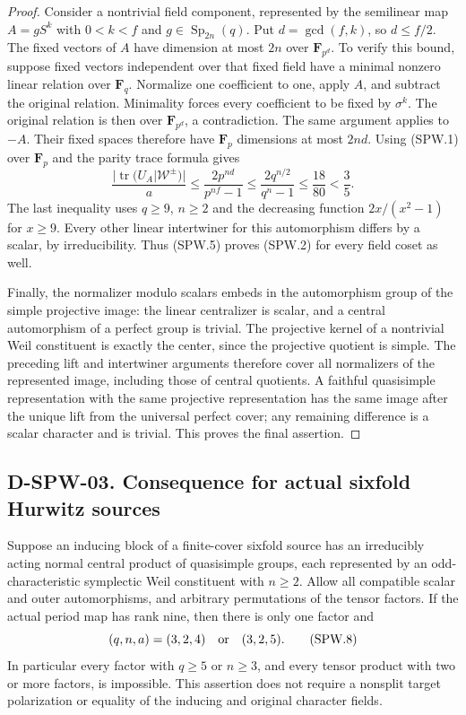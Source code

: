 \begin{proof}
Consider a nontrivial field component, represented by the
semilinear map $A=gS^k$ with $0<k<f$ and
$g\in\operatorname{Sp}_{2n}(q)$.
Put $d=\gcd(f,k)$, so $d\le f/2$.
The fixed vectors of $A$ have dimension at most $2n$ over
$\mathbf F_{p^d}$.  To verify this bound, suppose fixed vectors
independent over that fixed field have a minimal nonzero linear
relation over $\mathbf F_q$.  Normalize one coefficient to one,
apply $A$, and subtract the original relation.  Minimality forces
every coefficient to be fixed by $\sigma^k$.  The original
relation is then over $\mathbf F_{p^d}$, a contradiction.
The same argument applies to $-A$.  Their fixed spaces therefore
have $\mathbf F_p$ dimensions at most $2nd$.
Using (SPW.1) over $\mathbf F_p$ and the parity trace formula gives
\[
 \frac{|\operatorname{tr}(U_A|\mathcal W^{\pm})|}{a}
 \le\frac{2p^{nd}}{p^{nf}-1}
 \le\frac{2q^{n/2}}{q^n-1}
 \le\frac{18}{80}<\frac35.                                \tag{SPW.7}
\]
The last inequality uses $q\ge9$, $n\ge2$ and the decreasing
function $2x/(x^2-1)$ for $x\ge9$.
Every other linear intertwiner for this automorphism differs
by a scalar, by irreducibility.  Thus (SPW.5) proves (SPW.2)
for every field coset as well.

Finally, the normalizer modulo scalars embeds in the automorphism
group of the simple projective image: the linear centralizer is
scalar, and a central automorphism of a perfect group is trivial.
The projective kernel of a nontrivial Weil constituent is exactly
the center, since the projective quotient is simple.  The preceding
lift and intertwiner arguments therefore cover all normalizers
of the represented image, including those of central quotients.
A faithful quasisimple representation with the same projective
representation has the same image after the unique lift from
the universal perfect cover; any remaining difference is a scalar
character and is trivial.  This proves the final assertion.
\end{proof}

\subsection*{D-SPW-03. Consequence for actual sixfold Hurwitz sources}

\begin{theorem}
\label{D-SPW-03}
Suppose an inducing block of a finite-cover sixfold source has
an irreducibly acting normal central product of quasisimple
groups, each represented by an odd-characteristic symplectic
Weil constituent with $n\ge2$.  Allow all compatible scalar
and outer automorphisms, and arbitrary permutations of the
tensor factors.  If the actual period map has rank nine, then
there is only one factor and
\[
                 (q,n,a)=(3,2,4)\quad\hbox{or}\quad(3,2,5).
                                                               \tag{SPW.8}
\]
In particular every factor with $q\ge5$ or $n\ge3$, and every
tensor product with two or more factors, is impossible.
This assertion does not require a nonsplit target polarization
or equality of the inducing and original character fields.
\end{theorem}


